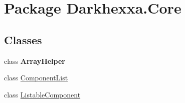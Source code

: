 \hypertarget{namespace_darkhexxa_1_1_core}{\section{Package Darkhexxa.\-Core}
\label{namespace_darkhexxa_1_1_core}
}
\subsection*{Classes}
\begin{DoxyCompactItemize}
\item 
class {\bfseries Array\-Helper}
\item 
class \hyperlink{class_darkhexxa_1_1_core_1_1_component_list}{Component\-List}
\item 
class \hyperlink{class_darkhexxa_1_1_core_1_1_listable_component}{Listable\-Component}
\end{DoxyCompactItemize}
